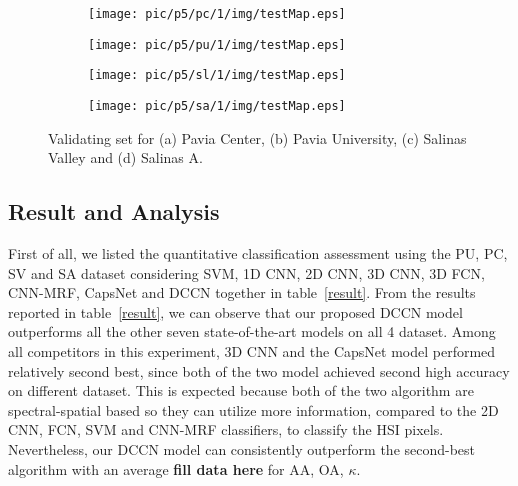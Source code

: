\documentclass{article}
\begin{document}
	\begin{figure}[htbp]
		\begin{subfigure}{0.24\textwidth}
			\texttt{[image: pic/p5/pc/1/img/testMap.eps]}
			\caption{}
		\end{subfigure}
		\begin{subfigure}{0.24\textwidth}
			\texttt{[image: pic/p5/pu/1/img/testMap.eps]}
			\caption{}
		\end{subfigure}
		\begin{subfigure}{0.24\textwidth}
			\texttt{[image: pic/p5/sl/1/img/testMap.eps]}
			\caption{}
		\end{subfigure}
		\begin{subfigure}{0.24\textwidth}
			\texttt{[image: pic/p5/sa/1/img/testMap.eps]}
			\caption{}
		\end{subfigure}
		\caption{Validating set for (a) Pavia Center, (b) Pavia University, (c) Salinas Valley and (d) Salinas A.}
		\label{testMaps}
	\end{figure}

	\subsection{Result and Analysis}\label{subsec:result-and-analysis}
	First of all, we listed the quantitative classification assessment using the PU, PC, SV and SA dataset considering
	SVM,
	1D CNN\cite{hu2015deep},
	2D CNN\cite{liu2017semi},
	3D CNN\cite{hamida20183},
	3D FCN\cite{lee2016contextual},
	CNN-MRF\cite{cao2018hyperspectral},
	CapsNet and DCCN together in table~\ref{result}.
	From the results reported in table~\ref{result}, we can observe that our proposed DCCN model outperforms all the
	other seven state-of-the-art models on all 4 dataset.
	Among all competitors in this experiment, 3D CNN\cite{hamida20183} and the CapsNet model performed relatively second
	best, since both of the two model achieved second high accuracy on different dataset.
	This is expected because both of the two algorithm are spectral-spatial based so they can utilize more information,
	compared to the 2D CNN, FCN, SVM and CNN-MRF classifiers, to classify the HSI pixels.
	Nevertheless, our DCCN model can consistently outperform the second-best algorithm with an average \textbf{fill data
	here} for AA, OA, $\kappa$.
\end{document}
